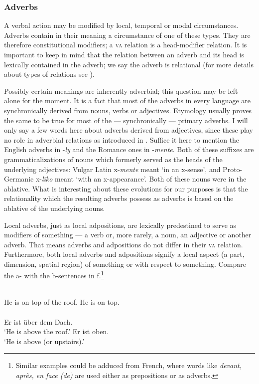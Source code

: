 \subsubsection{Adverbs} \label{sec:3.4.1.4}
A verbal action may be modified by local, temporal or modal circumstances. Adverbs contain in their meaning a circumstance of one of these types. They are therefore constitutional modifiers; a \textsc{va} relation is a head-modifier relation. It is important to keep in mind that the relation between an adverb and its head is lexically contained in the adverb; we say the adverb is relational (for more details about types of relations see \citealt{Lehmann1983}).

Possibly certain meanings are inherently adverbial; this question may be left alone for the moment. It is a fact that most of the adverbs in every language are synchronically derived from nouns, verbs or adjectives. Etymology usually proves the same to be true for most of the — synchronically — primary adverbs. I will only say a few words here about adverbs derived from adjectives, since these play no role in adverbial relations as introduced in . Suffice it here to mention the English adverbs in -\textit{ly} and the Romance ones in -\textit{mente}. Both of these suffixes are grammaticalizations of nouns which formerly served as the heads of the underlying adjectives: Vulgar Latin x-\textit{mente} meant ‘in an x-sense’, and Proto-Germanic x-\textit{l\=iko} meant ‘with an x-appearance’. Both of these nouns were in the ablative. What is interesting about these evolutions for our purposes is that the relationality which the resulting adverbs possess as adverbs is based on the ablative of the underlying nouns.

Local adverbs, just as local adpositions, are lexically predestined to serve as modifiers of something — a verb or, more rarely, a noun, an adjective or another adverb. That means adverbs and adpositions do not differ in their \textsc{va} relation. Furthermore, both local adverbs and adpositions signify a local aspect (a part, dimension, spatial region) of something or with respect to something. Compare the a- with the b-sentences in f.\footnote{Similar examples could be adduced from French, where words like \textit{devant, après, en face (de)} are used either as prepositions or as adverbs.}

\ea\label{ex:E62}
 \langinfo{\LangEngl}{}{} \\
\ea He is on top of the roof. 
 \ex  He is on top.  \\
\z
\z
\noindent \ea\label{ex:E63}
\langinfo{\LangGerm}{}{}\\
 \ea Er ist über dem Dach.\\
 \glt ‘He is above the roof.’
\ex  Er ist oben. \\  
	\glt ‘He is above (or upstairs).’
\z
\z
 
